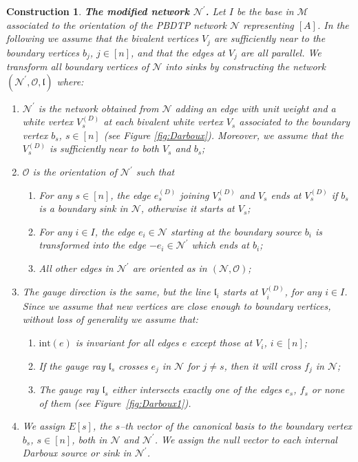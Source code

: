 \documentclass[11pt]{amsart}
\theoremstyle{plain}
\numberwithin{equation}{section}
\newtheorem{construction}{Construction}[subsection]
\begin{document}
\begin{construction}\label{con:Nprime}\textbf{The modified network ${\mathcal N}^{\prime}$.}
Let $I$ be the base in $\mathcal M$ associated to the orientation of the PBDTP network $\mathcal N$ representing $[A]$. In the following we assume that the bivalent vertices $V_j$ are sufficiently near to the boundary vertices $b_j$, $j\in [n]$, and that the edges at  $V_j$ are all parallel.
We transform all boundary vertices of $\mathcal N$ into sinks by constructing the network  $({\mathcal N}^{\prime}, {\mathcal O}, \mathfrak l)$ where: 
\begin{enumerate}
\item ${\mathcal N}^{\prime}$ is the network obtained from ${\mathcal N}$ adding an edge with unit weight and a white vertex $V^{(D)}_{s}$ at each bivalent white vertex $V_{s}$ associated to the boundary vertex $b_s$, $s\in [n]$ (see Figure \ref{fig:Darboux}). Moreover, we assume that the  $V^{(D)}_{s}$ is sufficiently near to both $V_{s}$ and $b_s$;
\item $\mathcal O$ is the orientation of ${\mathcal N}^{\prime}$ such that
\begin{enumerate}
\item For any $s\in [n]$, the edge $e^{(D)}_s$ joining $V^{(D)}_{s}$ and $V_s$ ends at $V^{(D)}_{s}$ if $b_s$ is a boundary sink in $\mathcal N$, otherwise it starts at $V_s$;
\item For any $i\in I$, the edge $e_i\in \mathcal N$ starting at the boundary source $b_{i}$ is transformed into the edge $-e_i\in {\mathcal N}^{\prime}$ which ends at $b_{i}$;
\item All other edges in $\mathcal N^{\prime}$ are oriented as in $({\mathcal N},\mathcal O)$;
\end{enumerate}
\item The gauge direction is the same, but the line ${\mathfrak l}_{i}$ starts at $V^{(D)}_{i}$, for any $i\in I$. Since we assume that new vertices are close enough to boundary vertices, without loss of generality we assume that:
\begin{enumerate}
\item $\mbox{int}(e)$ is invariant for all edges $e$ except those at $V_i$, $i\in [n]$; 
\item If the gauge ray $\mathfrak{l}_s$ crosses $e_j$ in $\mathcal N$ for $j\ne s$, then it will cross $f_j$ in $\mathcal N$;
\item The gauge ray $\mathfrak{l}_s$ either intersects exactly one of the edges $e_s$, $f_s$ or none of them (see Figure~\ref{fig:Darboux1}).   
\end{enumerate}
\item We assign $E[s]$, the $s$--th vector of the canonical basis to the boundary vertex $b_s$, $s\in [n]$, both in $\mathcal N$ and $\mathcal N^{\prime}$. We assign the null vector to each internal Darboux source or sink in $\mathcal N^{\prime}$.
\end{enumerate}
\end{construction}
\end{document}
